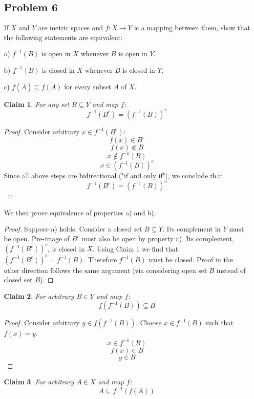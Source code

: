 \documentclass{article}
\newtheorem{claim}{Claim}
\begin{document}
\subsection*{Problem 6}

\begin{tcolorbox}
If $X$ and $Y$ are metric spaces and $f : X \to Y$ is a mapping between them, show that the following statements are equivalent:

a) $f^{-1} (B)$ is open in $X$ whenever $B$ is open in $Y$.

b) $f^{-1} (B)$ is closed in $X$ whenever $B$ is closed in $Y$.

c) $f(\overline{A}) \subseteq \overline{f(A)}$ for every subset $A$ of $X$.
\end{tcolorbox}

\begin{claim}
For any set $B \subseteq Y$ and map $f$:
$$ f^{-1}(B^c) = (f^{-1}(B))^c $$
\end{claim}

\begin{proof}
Consider arbitrary $x \in f^{-1}(B^c)$:
$$ f(x) \in B^c $$
$$ f(x) \notin B $$
$$ x \notin f^{-1}(B) $$
$$ x \in (f^{-1}(B))^c $$
Since all above steps are bidirectional ("if and only if"), we conclude that
$$ f^{-1}(B^c) = (f^{-1}(B))^c $$
\end{proof}

We then prove equivalence of properties a) and b).
\begin{proof}
Suppose a) holds. Consider a closed set $B \subseteq Y$. Its complement in $Y$ must be open. Pre-image of $B^c$ must also be open by property a). Its complement, $(f^{-1}(B^c))^c$, is closed in $X$. Using Claim 1 we find that $(f^{-1}(B^c))^c = f^{-1}(B)$. Therefore $f^{-1}(B)$ must be closed.
Proof in the other direction follows the same argument (via considering open set $B$ instead of closed set $B$).
\end{proof}

\begin{claim}
For arbitrary $B \in Y$ and map $f$:
$$ f(f^{-1}(B)) \subseteq B $$
\end{claim}

\begin{proof}
Consider arbitrary $y \in f(f^{-1}(B))$. Choose $x \in f^{-1}(B)$ such that $f(x) = y$.
$$ x \in f^{-1}(B) $$
$$ f(x) \in B $$
$$ y \in B $$
\end{proof}

\begin{claim}
For arbitrary $A \in X$ and map $f$:
$$ A \subseteq f^{-1}(f(A)) $$
\end{claim}
\end{document}
